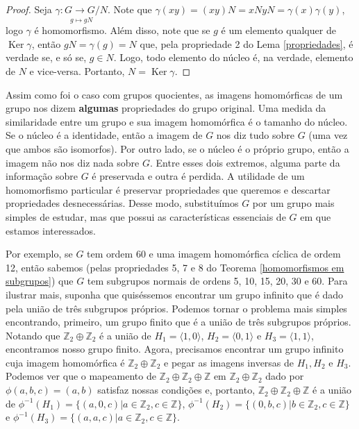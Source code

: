 \documentclass[a4paper,portuguese,11pt,twoside, leqno]{book}
\DeclareMathOperator{\Ker}{Ker}
\theoremstyle{definition}
\begin{document}
	\begin{proof}
		Seja $\displaystyle{ \underset{g\mapsto gN}{\gamma : G\to G/N   }}$. Note que $\gamma(xy) = (xy)N = xNyN = \gamma(x)\gamma(y)$, logo $\gamma$ é homomorfismo. Além disso, note que se $g$ é um elemento qualquer de $\Ker\gamma$, então $gN = \gamma(g) = N$ que, pela propriedade 2 do Lema \eqref{propriedades}, é verdade se, e só se, $g\in N$. Logo, todo elemento do núcleo é, na verdade, elemento de $N$ e vice-versa. Portanto, $N = \Ker\gamma$.
	\end{proof}
	\par\vspace{0.3cm} Assim como foi o caso com grupos quocientes, as imagens homomórficas de um grupo nos dizem \textbf{algumas} propriedades do grupo original. Uma medida da similaridade entre um grupo e sua imagem homomórfica é o tamanho do núcleo. Se o núcleo é a identidade, então a imagem de $G$ nos diz tudo sobre $G$ (uma vez que ambos são isomorfos). Por outro lado, se o núcleo é o próprio grupo, então a imagem não nos diz nada sobre $G$. Entre esses dois extremos, alguma parte da informação sobre $G$ é preservada e outra é perdida. A utilidade de um homomorfismo particular é preservar propriedades que queremos e descartar propriedades desnecessárias. Desse modo, substituímos $G$ por um grupo mais simples de estudar, mas que possui as características essenciais de $G$ em que estamos interessados.	\par\vspace{0.3cm} Por exemplo, se $G$ tem ordem 60 e uma imagem homomórfica cíclica de ordem 12, então sabemos (pelas propriedades 5, 7 e 8 do Teorema \eqref{homomorfismos em subgrupos}) que $G$ tem subgrupos normais de ordens 5, 10, 15, 20, 30 e 60. Para ilustrar mais, suponha que quiséssemos encontrar um grupo infinito que é dado pela união de três subgrupos próprios. Podemos tornar o problema mais simples encontrando, primeiro, um grupo finito que é a união de três subgrupos próprios. Notando que $\mathbb{Z}_2\oplus\mathbb{Z}_2$ é a união de $H_1 = \langle 1,0 \rangle$, $H_2 = \langle 0,1 \rangle$ e $H_3 = \langle 1,1 \rangle$, encontramos nosso grupo finito. Agora, precisamos encontrar um grupo infinito cuja imagem homomórfica é $\mathbb{Z}_2\oplus\mathbb{Z}_2$ e pegar as imagens inversas de $H_1, H_2$ e $H_3$. Podemos ver que o mapeamento de $\mathbb{Z}_2\oplus\mathbb{Z}_2\oplus\mathbb{Z}$ em $\mathbb{Z}_2\oplus\mathbb{Z}_2$ dado por $\phi(a,b,c) = (a,b)$ satisfaz nossas condições e, portanto, $\mathbb{Z}_2\oplus\mathbb{Z}_2\oplus\mathbb{Z}$ é a união de $\phi^{-1}(H_1) = \{ (a,0,c)|a\in\mathbb{Z}_2, c\in\mathbb{Z} \}$, $\phi^{-1}(H_2) = \{ (0,b,c)|b\in\mathbb{Z}_2, c\in\mathbb{Z} \}$ e $\phi^{-1}(H_3) = \{ (a,a,c)|a\in\mathbb{Z}_2, c\in\mathbb{Z} \}$.
\end{document}
